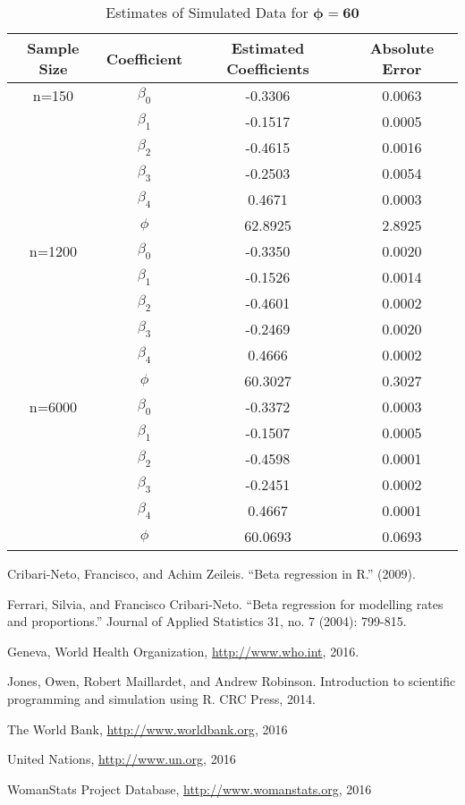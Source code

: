 \documentclass{svproc}
\begin{document}
\begin{table}[H]
\caption{Estimates of Simulated Data for $\bm{\phi=60}$}
\fontsize{9}{10}\selectfont
\begin{center}
\begin{tabular}{|c|c|c|c|}
\hline
\textbf{Sample Size} & \textbf{Coefficient} & \textbf{Estimated Coefficients} & \textbf{Absolute Error} \\
\hline
n=150 & $\beta_0$ & -0.3306 & 0.0063 \\
 & $\beta_1$ & -0.1517 & 0.0005 \\
 & $\beta_2$ & -0.4615 & 0.0016 \\
 & $\beta_3$ & -0.2503 & 0.0054 \\
 & $\beta_4$ & 0.4671 & 0.0003 \\
 & $\phi$ & 62.8925 &  2.8925 \\
\hline
n=1200 & $\beta_0$ & -0.3350  & 0.0020\\
 & $\beta_1$ & -0.1526 & 0.0014 \\
 & $\beta_2$ & -0.4601 & 0.0002 \\
 & $\beta_3$ & -0.2469 & 0.0020 \\
 & $\beta_4$ & 0.4666 & 0.0002 \\
 & $\phi$ & 60.3027 &  0.3027 \\
\hline
n=6000 & $\beta_0$ & -0.3372 & 0.0003\\
 & $\beta_1$ & -0.1507 & 0.0005 \\
 & $\beta_2$ & -0.4598 & 0.0001 \\
 & $\beta_3$ & -0.2451 & 0.0002 \\
 & $\beta_4$ & 0.4667 & 0.0001 \\
 & $\phi$ & 60.0693 &  0.0693 \\
\hline
\end{tabular}
\label{tab:est60}
\end{center}
\end{table}

\newpage

\begin{thebibliography}{6}

\makeatletter
\renewcommand*{\@biblabel}[1]{\hfill#1.}
\makeatother

Cribari-Neto, Francisco, and Achim Zeileis. \enquote{Beta regression in R.} (2009).

Ferrari, Silvia, and Francisco Cribari-Neto. \enquote{Beta regression for modelling rates and proportions.} Journal of Applied Statistics 31, no. 7 (2004): 799-815.

Geneva, World Health Organization, \url{http://www.who.int}, 2016.

Jones, Owen, Robert Maillardet, and Andrew Robinson. Introduction to scientific programming and simulation using R. CRC Press, 2014.

The World Bank, \url{http://www.worldbank.org}, 2016

United Nations, \url{http://www.un.org}, 2016

WomanStats Project Database, \url{http://www.womanstats.org}, 2016

\end{thebibliography}
\end{document}
